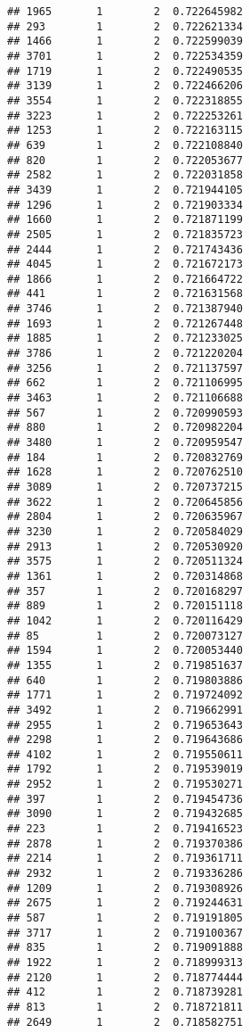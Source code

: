 \documentclass[
]{article}
\begin{document}
\begin{verbatim}
## 1965       1        2  0.722645982
## 293        1        2  0.722621334
## 1466       1        2  0.722599039
## 3701       1        2  0.722534359
## 1719       1        2  0.722490535
## 3139       1        2  0.722466206
## 3554       1        2  0.722318855
## 3223       1        2  0.722253261
## 1253       1        2  0.722163115
## 639        1        2  0.722108840
## 820        1        2  0.722053677
## 2582       1        2  0.722031858
## 3439       1        2  0.721944105
## 1296       1        2  0.721903334
## 1660       1        2  0.721871199
## 2505       1        2  0.721835723
## 2444       1        2  0.721743436
## 4045       1        2  0.721672173
## 1866       1        2  0.721664722
## 441        1        2  0.721631568
## 3746       1        2  0.721387940
## 1693       1        2  0.721267448
## 1885       1        2  0.721233025
## 3786       1        2  0.721220204
## 3256       1        2  0.721137597
## 662        1        2  0.721106995
## 3463       1        2  0.721106688
## 567        1        2  0.720990593
## 880        1        2  0.720982204
## 3480       1        2  0.720959547
## 184        1        2  0.720832769
## 1628       1        2  0.720762510
## 3089       1        2  0.720737215
## 3622       1        2  0.720645856
## 2804       1        2  0.720635967
## 3230       1        2  0.720584029
## 2913       1        2  0.720530920
## 3575       1        2  0.720511324
## 1361       1        2  0.720314868
## 357        1        2  0.720168297
## 889        1        2  0.720151118
## 1042       1        2  0.720116429
## 85         1        2  0.720073127
## 1594       1        2  0.720053440
## 1355       1        2  0.719851637
## 640        1        2  0.719803886
## 1771       1        2  0.719724092
## 3492       1        2  0.719662991
## 2955       1        2  0.719653643
## 2298       1        2  0.719643686
## 4102       1        2  0.719550611
## 1792       1        2  0.719539019
## 2952       1        2  0.719530271
## 397        1        2  0.719454736
## 3090       1        2  0.719432685
## 223        1        2  0.719416523
## 2878       1        2  0.719370386
## 2214       1        2  0.719361711
## 2932       1        2  0.719336286
## 1209       1        2  0.719308926
## 2675       1        2  0.719244631
## 587        1        2  0.719191805
## 3717       1        2  0.719100367
## 835        1        2  0.719091888
## 1922       1        2  0.718999313
## 2120       1        2  0.718774444
## 412        1        2  0.718739281
## 813        1        2  0.718721811
## 2649       1        2  0.718582751

\end{verbatim}
\end{document}
